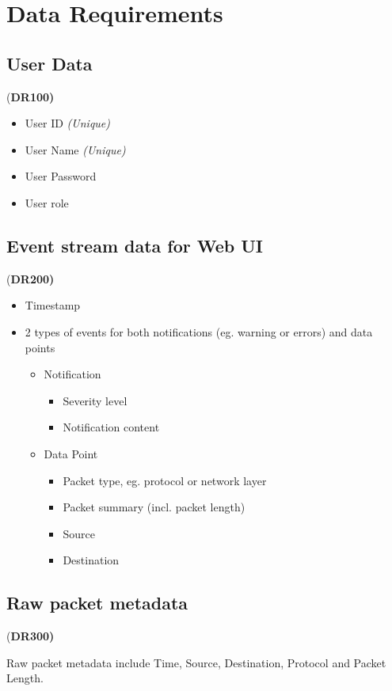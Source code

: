\documentclass[twoside, english, draft]{Pflichtenheft}
\begin{document}
\section{Data Requirements}
\subsection{User Data} (\textbf{DR100)}

\begin{itemize}
	\item User ID \textit{(Unique)}
	\item User Name \textit{(Unique)}
	\item User Password
	\item User \gls{role}
\end{itemize}


\subsection{Event stream data for Web UI} (\textbf{DR200)}

\begin{itemize}
	\item Timestamp
	\item 2 types of events for both notifications (eg. warning or errors) and data points
	      \begin{itemize}
		      \item Notification
		            \begin{itemize}
			            \item Severity level
			            \item Notification content
		            \end{itemize}
		      \item Data Point
		            \begin{itemize}
			            \item Packet type, eg. protocol or network layer
			            \item Packet summary (incl. packet length)
			            \item Source
			            \item Destination
		            \end{itemize}
	      \end{itemize}
\end{itemize}

\subsection{Raw packet metadata}(\textbf{DR300)}
\begin{description}
	\item
	      Raw packet metadata include Time, Source, Destination, Protocol and Packet Length.
\end{description}
\end{document}
